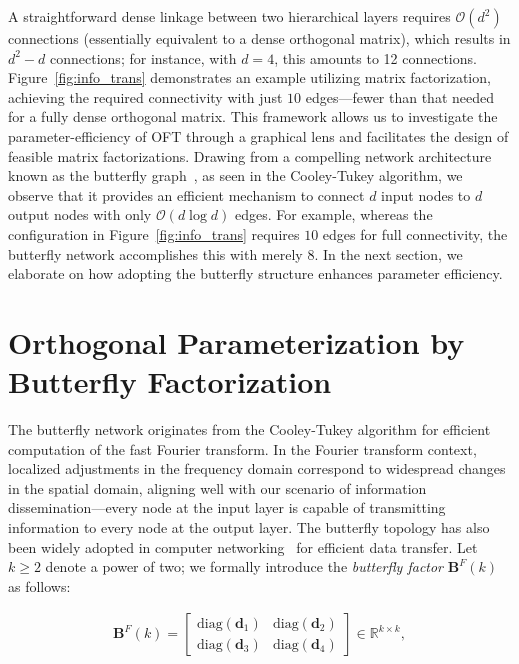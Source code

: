 A straightforward dense linkage between two hierarchical layers requires $\mathcal{O}(d^2)$ connections (essentially equivalent to a dense orthogonal matrix), which results in $d^2-d$ connections; for instance, with $d=4$, this amounts to 12 connections. Figure~\ref{fig:info_trans} demonstrates an example utilizing matrix factorization, achieving the required connectivity with just $10$ edges—fewer than that needed for a fully dense orthogonal matrix. This framework allows us to investigate the parameter-efficiency of OFT through a graphical lens and facilitates the design of feasible matrix factorizations. Drawing from a compelling network architecture known as the butterfly graph~\cite{cooley1965algorithm}, as seen in the Cooley-Tukey algorithm, we observe that it provides an efficient mechanism to connect $d$ input nodes to $d$ output nodes with only $\mathcal{O}(d\log d)$ edges. For example, whereas the configuration in Figure~\ref{fig:info_trans} requires $10$ edges for full connectivity, the butterfly network accomplishes this with merely $8$. In the next section, we elaborate on how adopting the butterfly structure enhances parameter efficiency.

\section{Orthogonal Parameterization by Butterfly Factorization}

The butterfly network originates from the Cooley-Tukey algorithm for efficient computation of the fast Fourier transform. In the Fourier transform context, localized adjustments in the frequency domain correspond to widespread changes in the spatial domain, aligning well with our scenario of information dissemination—every node at the input layer is capable of transmitting information to every node at the output layer. The butterfly topology has also been widely adopted in computer networking~\cite{solihin2015fundamentals,li2011linear} for efficient data transfer. Let $k\geq 2$ denote a power of two; we formally introduce the \emph{butterfly factor} $\bm{B}^F(k)$ as follows:

\begin{equation}\label{eq:but_factor}
\begin{aligned}
    \bm{B}^F(k)=\begin{bmatrix}
    \text{diag}(\bm{d}_1) & \text{diag}(\bm{d}_2) \\
    \text{diag}(\bm{d}_3) & \text{diag}(\bm{d}_4)
    \end{bmatrix}\in\mathbb{R}^{k\times k},
\end{aligned}
\end{equation}

